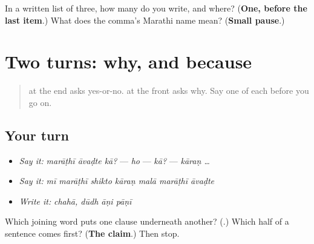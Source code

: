\begin{tcolorbox}[breakable,colback=teal!4,colframe=teal!35!black,title={Before you move on}]
In a written list of three, how many \textbf{} do you write, and where? (\textbf{One, before the last item}.) What does the comma's Marathi name mean? (\textbf{Small pause}.)
\end{tcolorbox}
\section[\texorpdfstring{\mr{का}? — \mr{कारण} … (kā? — kāraṇ …)}{का? — कारण … (kā? — kāraṇ …)}]{Two turns: why, and because}

\label{lesson:MR-R34-reasons}



\begin{quote}
\textbf{} at the end asks yes-or-no. \textbf{} at the front asks why. Say one of each before you go on.
\end{quote}

\subsection*{Your turn}
\begin{itemize}
\raggedright
  \item \emph{Say it:} \emph{marāṭhī āvaḍte kā?} — \emph{ho} — \emph{kā?} — \emph{kāraṇ …}
  \item \emph{Say it:} \emph{mī marāṭhī shikto kāraṇ malā marāṭhī āvaḍte}
  \item \emph{Write it:} \emph{chahā, dūdh āṇi pāṇī}
\end{itemize}

\begin{tcolorbox}[breakable,colback=teal!4,colframe=teal!35!black,title={Before you move on}]
Which joining word puts one clause underneath another? (\textbf{}.) Which half of a \textbf{} sentence comes first? (\textbf{The claim}.) Then stop.
\end{tcolorbox}
